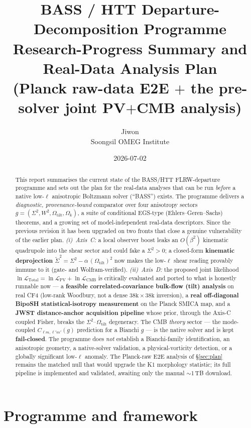 \documentclass[11pt]{article}
\title{\textbf{BASS / HTT Departure-Decomposition Programme}\\[2pt]
\large Research-Progress Summary and Real-Data Analysis Plan\\
\normalsize (Planck raw-data E2E $+$ the pre-solver joint PV$+$CMB analysis)}
\author{Jiwon \\ \small Soongsil OMEG Institute}
\date{2026-07-02}
\newcommand{\Sig}{\Sigma^2}
\newcommand{\Sigt}{\widetilde{\Sigma}^2}
\newcommand{\Wsq}{W^2}
\newcommand{\Otilt}{\Omega_{\mathrm{tilt}}}
\newcommand{\Ok}{\Omega_{k}}
\begin{document}
\maketitle

\begin{abstract}
\noindent This report summarises the current state of the BASS/HTT
FLRW-departure programme and sets out the plan for the real-data analyses that
can be run \emph{before} a native low-$\ell$ anisotropic Boltzmann solver
(``BASS'') exists. The programme delivers a \emph{diagnostic, provenance-bound}
comparator over four anisotropy sectors $g=(\Sig,\Wsq,\Otilt,\Ok)$, a suite of
conditional EGS-type (Ehlers--Geren--Sachs) theorems, and a growing set of
model-independent real-data descriptors. Since the previous revision it has been
upgraded on two fronts that close a genuine vulnerability of the earlier plan.
\emph{(i)~Axis~C:} a local observer boost leaks an $O(\beta^2)$ kinematic
quadrupole into the shear sector and could fake a $\Sig>0$; a closed-form
\textbf{kinematic deprojection} $\Sigt=\Sig-\alpha\,(\Otilt)^2$ now makes the
low-$\ell$ shear reading provably immune to it (gate- and Wolfram-verified).
\emph{(ii)~Axis~D:} the proposed joint likelihood
$\ln\mathcal{L}_{\mathrm{Total}}=\ln\mathcal{L}_{\mathrm{PV}}+\ln\mathcal{L}_{\mathrm{CMB}}$
is critically evaluated and ported to what is honestly runnable now --- a
\textbf{feasible correlated-covariance bulk-flow (tilt) analysis} on real CF4
(low-rank Woodbury, not a dense $38\text{k}\times38\text{k}$ inversion), a
\textbf{real off-diagonal BipoSH statistical-isotropy measurement} on the Planck
SMICA map, and a \textbf{JWST distance-anchor acquisition pipeline} whose prior,
through the Axis-C coupled Fisher, breaks the $\Sig$--$\Otilt$ degeneracy. The
CMB \emph{theory} sector --- the mode-coupled $C_{\ell m,\ell'm'}(g)$ prediction
for a Bianchi $g$ --- is the native solver and is kept \textbf{fail-closed}. The
programme does \emph{not} establish a Bianchi-family identification, an
anisotropic geometry, a native-solver validation, a physical-vorticity
detection, or a globally significant low-$\ell$ anomaly. The Planck-raw E2E
analysis of \S\ref{sec:plan} remains the matched null that would upgrade the K1
morphology statistic; its full pipeline is implemented and validated, awaiting
only the manual $\sim$1\,TB download.
\end{abstract}

\section{Programme and framework}\label{sec:framework}
\end{document}
